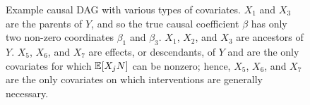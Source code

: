 \documentclass{article}
\begin{document}
\begin{enumerate}[itemsep=1em]
\begin{figure}[tb]
    \caption{Example causal DAG with various types of covariates. $X_1$ and $X_3$ are the parents of $Y$, and so the true causal coefficient $\beta$ has only two non-zero coordinates $\beta_1$ and $\beta_3$. $X_1$, $X_2$, and $X_3$ are ancestors of $Y$. $X_5$, $X_6$, and $X_7$ are effects, or descendants, of $Y$ and are the only covariates for which $\operatorname{\mathbb{E}}[X_j N]$ can be nonzero; hence, $X_5$, $X_6$, and $X_7$ are the only covariates on which interventions are generally necessary.}
    \label{fig:causal_recovery_example}
\end{figure}


\end{enumerate}
\end{document}
